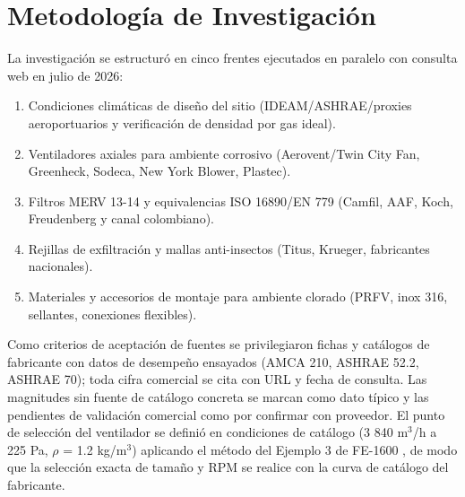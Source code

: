\section{Metodología de Investigación}

La investigación se estructuró en cinco frentes ejecutados en paralelo con consulta web en julio de 2026:

\begin{enumerate}
	\item Condiciones climáticas de diseño del sitio (IDEAM/ASHRAE/proxies aeroportuarios y verificación de densidad por gas ideal).
	\item Ventiladores axiales para ambiente corrosivo (Aerovent/Twin City Fan, Greenheck, Sodeca, New York Blower, Plastec).
	\item Filtros MERV 13-14 y equivalencias ISO 16890/EN 779 (Camfil, AAF, Koch, Freudenberg y canal colombiano).
	\item Rejillas de exfiltración y mallas anti-insectos (Titus, Krueger, fabricantes nacionales).
	\item Materiales y accesorios de montaje para ambiente clorado (PRFV, inox 316, sellantes, conexiones flexibles).
\end{enumerate}

Como criterios de aceptación de fuentes se privilegiaron fichas y catálogos de fabricante con datos de desempeño ensayados (AMCA 210, ASHRAE 52.2, ASHRAE 70); toda cifra comercial se cita con URL y fecha de consulta. Las magnitudes sin fuente de catálogo concreta se marcan como dato típico y las pendientes de validación comercial como por confirmar con proveedor. El punto de selección del ventilador se definió en condiciones de catálogo (3 840 m$^3$/h a 225 Pa, $\rho$ = 1.2 kg/m$^3$) aplicando el método del Ejemplo 3 de FE-1600 \cite{tcf_fe1600}, de modo que la selección exacta de tamaño y RPM se realice con la curva de catálogo del fabricante.

